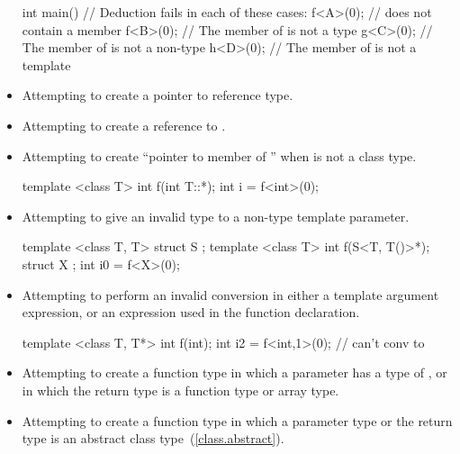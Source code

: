 \begin{note}
\begin{itemize}
\begin{example}
\begin{codeblock}
int main() {
  // Deduction fails in each of these cases:
  f<A>(0);  //  does not contain a member 
  f<B>(0);  // The  member of  is not a type
  g<C>(0);  // The  member of  is not a non-type
  h<D>(0);  // The  member of  is not a template
}
\end{codeblock}
\end{example}
\item
Attempting to create a pointer to reference type.
\item
Attempting to create a reference to .
\item
Attempting to create ``pointer to member of '' when  is not a
class type.
\begin{example}

\begin{codeblock}
template <class T> int f(int T::*);
int i = f<int>(0);
\end{codeblock}
\end{example}
\item
Attempting to give an invalid type to a non-type template parameter.
\begin{example}
\begin{codeblock}
template <class T, T> struct S {};
template <class T> int f(S<T, T()>*);
struct X {};
int i0 = f<X>(0);
\end{codeblock}
\end{example}

\item
Attempting to perform an invalid conversion in either a template
argument expression, or an expression used in the function
declaration.
\begin{example}

\begin{codeblock}
template <class T, T*> int f(int);
int i2 = f<int,1>(0);           // can't conv  to 
\end{codeblock}
\end{example}

\item
Attempting to create a function type in which a parameter has a type
of , or in which the return type is a function type
or array type.

\item
Attempting to create a function type in which a parameter type or the return type is an
abstract class type~(\ref{class.abstract}).
\end{itemize}
\end{note}

